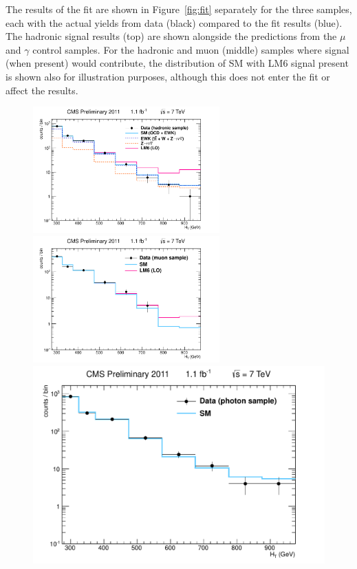The results of the fit are shown in Figure~\ref{fig:fit} separately for the three samples, each with the actual yields from data (black) compared to the fit results (blue). The hadronic signal results (top) are shown alongside the predictions from the $\mu$ and $\gamma$ control samples. For the hadronic and muon (middle) samples where signal (when present) would contribute, the distribution of SM with LM6 signal present is shown also for illustration purposes, although this does not enter the fit or affect the results. 

 \begin{figure}[htbp]
   \begin{center}

\includegraphics[width = 0.64\textwidth]{Figures/Analysis/PAS/stats_plots/RQcdFallingExp/hadronic_signal_fit_logy.pdf}
\includegraphics[width = 0.64\textwidth]{Figures/Analysis/PAS/stats_plots/RQcdFallingExp/muon_control_fit_logy.pdf}
\includegraphics[width = 0.64 \textwidth]{Figures/Analysis/PAS/stats_plots/RQcdFallingExp/photon_control_fit_logy.pdf} 
         

\end{center}
\end{figure}
